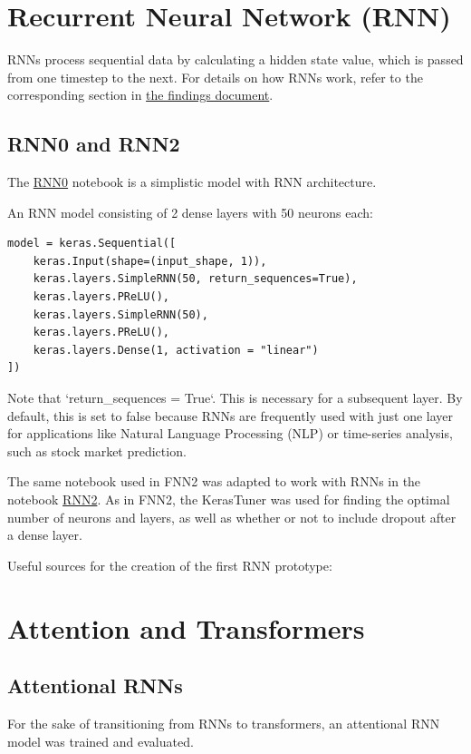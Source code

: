 \documentclass{article}
\begin{document}
\section{Recurrent Neural Network (RNN)}

RNNs process sequential data by calculating a hidden state value, which is passed from one timestep to the next. For details on how RNNs work, refer to the corresponding section in \href{https://github.com/AntonStantan/matura/blob/main/documentation/findings/findings.pdf}{the findings document}.

\subsection{RNN0 and RNN2}
The \href{https://github.com/AntonStantan/matura/blob/main/RNN/RNN0.ipynb}{RNN0} notebook is a simplistic model with RNN architecture.

An RNN model consisting of 2 dense layers with 50 neurons each:

\begin{Verbatim}
model = keras.Sequential([
    keras.Input(shape=(input_shape, 1)),
    keras.layers.SimpleRNN(50, return_sequences=True),
    keras.layers.PReLU(),
    keras.layers.SimpleRNN(50),
    keras.layers.PReLU(),
    keras.layers.Dense(1, activation = "linear")
])
\end{Verbatim}
Note that `return\_sequences = True`. This is necessary for a subsequent layer. By default, this is set to false because RNNs are frequently used with just one layer for applications like Natural Language Processing (NLP) or time-series analysis, such as stock market prediction.

The same notebook used in FNN2 was adapted to work with RNNs in the notebook \href{https://github.com/AntonStantan/matura/blob/main/RNN/RNN2.ipynb}{RNN2}. As in FNN2, the KerasTuner was used for finding the optimal number of neurons and layers, as well as whether or not to include dropout after a dense layer.

Useful sources for the creation of the first RNN prototype:
\cite{bowman2015recursiveneuralnetworkslearn, tensorflow_keras_rnn, ibm_rnn}


\section{Attention and Transformers}

\subsection{Attentional RNNs}
For the sake of transitioning from RNNs to transformers, an attentional RNN model was trained and evaluated.
\end{document}
